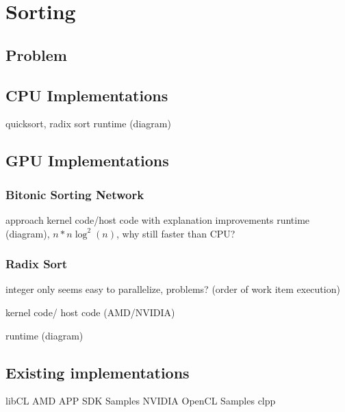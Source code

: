 \section{Sorting}

\subsection{Problem}

\subsection{CPU Implementations}
quicksort, radix sort
runtime (diagram)

\subsection{GPU Implementations}

\subsubsection{Bitonic Sorting Network}
approach
kernel code/host code with explanation
improvements
runtime (diagram), $n * n \log^2(n)$, why still faster than CPU?

\subsubsection{Radix Sort}
integer only
seems easy to parallelize, problems? (order of work item execution)

kernel code/ host code (AMD/NVIDIA)

runtime (diagram)

\subsection{Existing implementations}
libCL
AMD APP SDK Samples
NVIDIA OpenCL Samples
clpp
